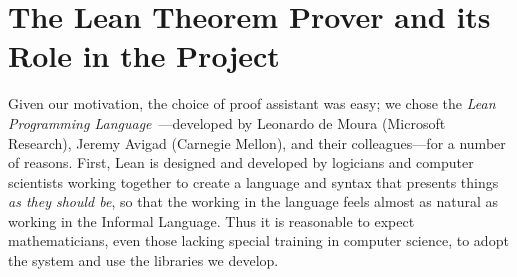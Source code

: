 \documentclass[11pt]{amsart}  %
\begin{document}







\section{The Lean Theorem Prover and its Role in the Project}
Given our motivation, the choice of proof assistant was easy; we chose the \emph{Lean Programming Language}~\cite{lean}---developed by Leonardo de Moura (Microsoft Research), Jeremy Avigad (Carnegie Mellon), and their colleagues---for a number of reasons.
First, Lean is designed and developed by logicians and computer scientists working together to create a language and syntax that presents things \emph{as they should be}, so that the working in the language feels almost as natural as working in the Informal Language. Thus it is reasonable to expect mathematicians, even those lacking special training in computer science, to adopt the system and use the libraries we develop.    
\end{document}
